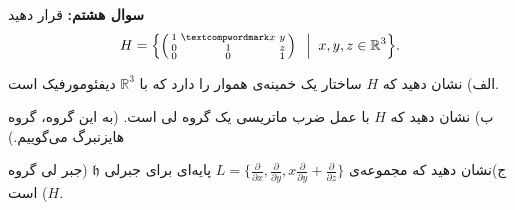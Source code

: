 \documentclass{article}
\begin{document}
\vspace{-2em}
\endline

	\textbf{سوال هشتم:}
	قرار دهید
	\begin{equation*}
		\begin{aligned}
			 H = \Bigl\{
			\left( \begin{smallmatrix}
			 	1 &‌x &y \\ 0&1&z \\ 0&0&1
			 \end{smallmatrix} \right) \;\;\Big| \;\; x,y,z \in \mathbb{R}^3
			 \Bigr\}.
		\end{aligned}
	\end{equation*}
	
	\noindent
	الف) نشان دهید که $H$ ساختار یک خمینه‌ی هموار را دارد که با 
	$\mathbb{R}^3$
	دیفئومورفیک است.
	
	\noindent
	ب) نشان دهید که $H$‌ با عمل ضرب ماتریسی یک گروه لی است. (به این گروه، گروه هایزنبرگ می‌گوییم.)
	
	\noindent
	ج)نشان دهید که مجموعه‌ی 
	$ L = \bigl\{
	\frac{\partial}{\partial x} , \frac{\partial}{\partial y} , x\frac{\partial}{\partial y} + \frac{\partial}{\partial z}
	\bigr\}$
	پایه‌ای برای جبرلی 
	$\mathfrak{h}$
	(جبر لی گروه $H$) است.
	
	\vspace{-2em}
	\endline
\end{document}
